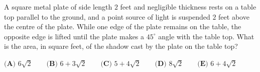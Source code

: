 A square metal plate of side length $2$ feet and negligible thickness rests on a table top parallel to the ground, and a point source of light is suspended $2$ feet above the centre of the plate. While one edge of the plate remains on the table, the opposite edge is lifted until the plate makes a $45^\circ$ angle with the table top. What is the area, in square feet, of the shadow cast by the plate on the table top?

$\textbf{(A) }6\sqrt2\qquad\textbf{(B) }6+3\sqrt2\qquad\textbf{(C) }5+4\sqrt2\qquad\textbf{(D) }8\sqrt2\qquad\textbf{(E) }6+4\sqrt2$
